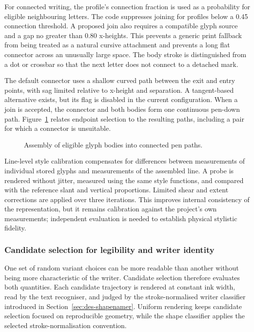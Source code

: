 For connected writing, the profile's connection fraction is used as a probability for eligible neighbouring letters. The code suppresses joining for profiles below a 0.45 connection threshold. A proposed join also requires a compatible glyph source and a gap no greater than 0.80 x-heights. This prevents a generic print fallback from being treated as a natural cursive attachment and prevents a long flat connector across an unusually large space. The body stroke is distinguished from a dot or crossbar so that the next letter does not connect to a detached mark.

The default connector uses a shallow curved path between the exit and entry points, with sag limited relative to x-height and separation. A tangent-based alternative exists, but its flag is disabled in the current configuration. When a join is accepted, the connector and both bodies form one continuous pen-down path. Figure~\ref{fig:des-joins} relates endpoint selection to the resulting paths, including a pair for which a connector is unsuitable.


\begin{figure}[!htbp]\centering
{}
\caption{Assembly of eligible glyph bodies into connected pen paths.}
\label{fig:des-joins}
\end{figure}

Line-level style calibration compensates for differences between measurements of individual stored glyphs and measurements of the assembled line. A probe is rendered without jitter, measured using the same style functions, and compared with the reference slant and vertical proportions. Limited shear and extent corrections are applied over three iterations. This improves internal consistency of the representation, but it remains calibration against the project's own measurements; independent evaluation is needed to establish physical stylistic fidelity.

\subsubsection{Candidate selection for legibility and writer identity}
\label{sec:des-selection}
One set of random variant choices can be more readable than another without being more characteristic of the writer. Candidate selection therefore evaluates both quantities. Each candidate trajectory is rendered at constant ink width, read by the text recogniser, and judged by the stroke-normalised writer classifier introduced in Section~\ref{sec:des-shapenamer}. Uniform rendering keeps candidate selection focused on reproducible geometry, while the shape classifier applies the selected stroke-normalisation convention.


